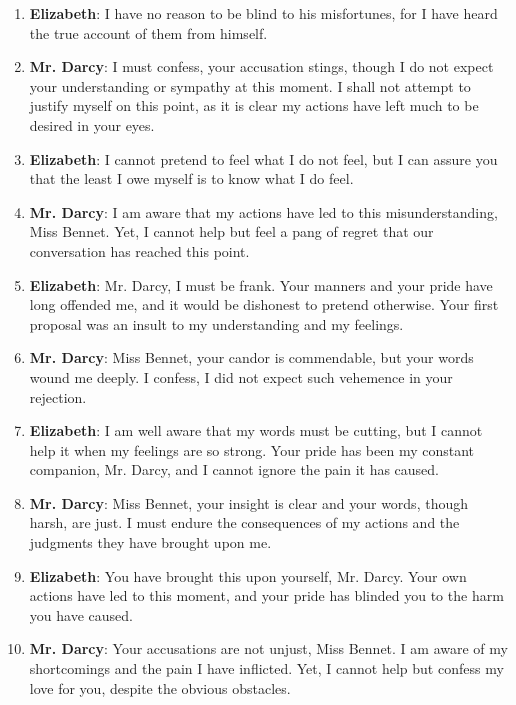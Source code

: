 \documentclass[10pt]{article}
\begin{document}
\begin{enumerate}\setlength{\itemsep}{1pt}\small

\item \textbf{Elizabeth}: I have no reason to be blind to his misfortunes, for I have heard the true account of them from himself.

\item \textbf{Mr. Darcy}: I must confess, your accusation stings, though I do not expect your understanding or sympathy at this moment. I shall not attempt to justify myself on this point, as it is clear my actions have left much to be desired in your eyes.

\item \textbf{Elizabeth}: I cannot pretend to feel what I do not feel, but I can assure you that the least I owe myself is to know what I do feel.

\item \textbf{Mr. Darcy}: I am aware that my actions have led to this misunderstanding, Miss Bennet. Yet, I cannot help but feel a pang of regret that our conversation has reached this point.

\item \textbf{Elizabeth}: Mr. Darcy, I must be frank. Your manners and your pride have long offended me, and it would be dishonest to pretend otherwise. Your first proposal was an insult to my understanding and my feelings.

\item \textbf{Mr. Darcy}: Miss Bennet, your candor is commendable, but your words wound me deeply. I confess, I did not expect such vehemence in your rejection.

\item \textbf{Elizabeth}: I am well aware that my words must be cutting, but I cannot help it when my feelings are so strong. Your pride has been my constant companion, Mr. Darcy, and I cannot ignore the pain it has caused.

\item \textbf{Mr. Darcy}: Miss Bennet, your insight is clear and your words, though harsh, are just. I must endure the consequences of my actions and the judgments they have brought upon me.

\item \textbf{Elizabeth}: You have brought this upon yourself, Mr. Darcy. Your own actions have led to this moment, and your pride has blinded you to the harm you have caused.

\item \textbf{Mr. Darcy}: Your accusations are not unjust, Miss Bennet. I am aware of my shortcomings and the pain I have inflicted. Yet, I cannot help but confess my love for you, despite the obvious obstacles.


\end{enumerate}
\end{document}
